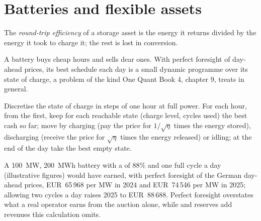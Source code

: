 \section{Batteries and flexible assets}

\begin{definition}\label{def:m3:power-markets-trading:rte}
The \emph{round-trip efficiency} of a storage asset is the energy
it returns divided by the energy it took to charge it; the rest is lost in conversion.
\end{definition}

A battery buys cheap hours and sells dear ones. With perfect foresight of day-ahead prices,
its best schedule each day is a small dynamic programme over its state of charge, a problem of
the kind One Quant Book 4, chapter 9, treats in general.

\begin{method}\label{met:m3:power-markets-trading:battery}
Discretise the state of charge in steps of one hour at full power. For each hour, from the
first, keep for each reachable state (charge level, cycles used) the best cash so far; move by
charging (pay the price for $1/\sqrt{\eta}$ times the energy stored), discharging (receive the
price for $\sqrt{\eta}$ times the energy released) or idling; at the end of the day take the
best empty state.
\end{method}

A 100~MW, 200~MWh battery with a  of 88\% and one full cycle a day
(illustrative figures) would have earned, with perfect foresight of the German day-ahead
prices, EUR~65\,968 per MW in 2024 and EUR~74\,546 per MW in 2025; allowing two cycles a day
raises 2025 to EUR~88\,688. Perfect foresight overstates what a real operator earns from the
auction alone, while  and reserves add revenues this calculation omits.

